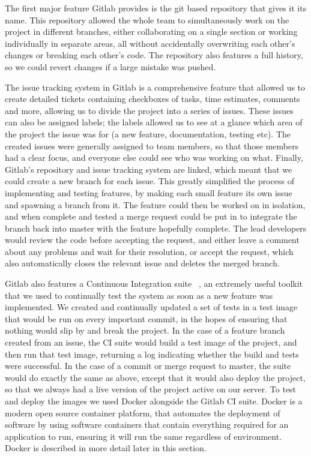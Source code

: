 \documentclass{l3proj}
\begin{document}
The first major feature Gitlab provides is the git based repository that gives it its name. This repository allowed the whole team to simultaneously work on the project in different branches, either collaborating on a single section or working individually in separate areas, all without accidentally overwriting each other's changes or breaking each other's code. The repository also features a full history, so we could revert changes if a large mistake was pushed.

The issue tracking system in Gitlab is a comprehensive feature that allowed us to create detailed tickets containing checkboxes of tasks, time estimates, comments and more, allowing us to divide the project into a series of issues. These issues can also be assigned labels; the labels allowed us to see at a glance which area of the project the issue was for (a new feature, documentation, testing etc). The created issues were generally assigned to team members, so that those members had a clear focus, and everyone else could see who was working on what. Finally, Gitlab's repository and issue tracking system are linked, which meant that we could create a new branch for each issue. This greatly simplified the process of implementing and testing features, by making each small feature its own issue and spawning a branch from it. The feature could then be worked on in isolation, and when complete and tested a merge request could be put in to integrate the branch back into master with the feature hopefully complete. The lead developers would review the code before accepting the request, and either leave a comment about any problems and wait for their resolution, or accept the request, which also automatically closes the relevant issue and deletes the merged branch.

Gitlab also features a Continuous Integration suite ~\cite{ci}, an extremely useful toolkit that we used to continually test the system as soon as a new feature was implemented. We created and continually updated a set of tests in a test image that would be run on every important commit, in the hopes of ensuring that nothing would slip by and break the project. In the case of a feature branch created from an issue, the CI suite would build a test image of the project, and then run that test image, returning a log indicating whether the build and tests were successful. In the case of a commit or merge request to master, the suite would do exactly the same as above, except that it would also deploy the project, so that we always had a live version of the project active on our server. To test and deploy the images we used Docker alongside the Gitlab CI suite. Docker is a modern open source container platform, that automates the deployment of software by using software containers that contain everything required for an application to run, ensuring it will run the same regardless of environment. Docker is described in more detail later in this section.
\end{document}
